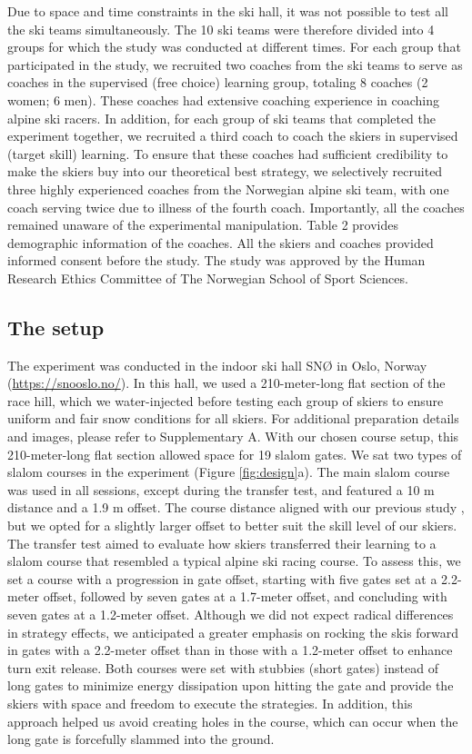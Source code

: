 \documentclass[pdflatex,sn-mathphys-num]{sn-jnl}%
\theoremstyle{thmstyleone}%
\theoremstyle{thmstyletwo}%
\theoremstyle{thmstylethree}%
\begin{document}
Due to space and time constraints in the ski hall, it was not possible to test all the ski teams simultaneously. The 10 ski teams were therefore divided into 4 groups for which the study was conducted at different times. For each group that participated in the study, we recruited two coaches from the ski teams to serve as coaches in the supervised (free choice) learning group, totaling 8 coaches (2 women; 6 men). These coaches had extensive coaching experience in coaching alpine ski racers. In addition, for each group of ski teams that completed the experiment together, we recruited a third coach to coach the skiers in supervised (target skill) learning. To ensure that these coaches had sufficient credibility to make the skiers buy into our theoretical best strategy, we selectively recruited three highly experienced coaches from the Norwegian alpine ski team, with one coach serving twice due to illness of the fourth coach. Importantly, all the coaches remained unaware of the experimental manipulation. Table 2 provides demographic information of the coaches. All the skiers and coaches provided informed consent before the study. The study was approved by the Human Research Ethics Committee of The Norwegian School of Sport Sciences.


\subsection{The setup}
The experiment was conducted in the indoor ski hall SNØ in Oslo, Norway (\url{https://snooslo.no/}). In this hall, we used a 210-meter-long flat section of the race hill, which we water-injected before testing each group of skiers to ensure uniform and fair snow conditions for all skiers. For additional preparation details and images, please refer to Supplementary A. With our chosen course setup, this 210-meter-long flat section allowed space for 19 slalom gates. We sat two types of slalom courses in the experiment (Figure \ref{fig:design}a). The main slalom course was used in all sessions, except during the transfer test, and featured a 10 m distance and a 1.9 m offset. The course distance aligned with our previous study \cite{magelssen_is_2022}, but we opted for a slightly larger offset to better suit the skill level of our skiers. The transfer test aimed to evaluate how skiers transferred their learning to a slalom course that resembled a typical alpine ski racing course. To assess this, we set a course with a progression in gate offset, starting with five gates set at a 2.2-meter offset, followed by seven gates at a 1.7-meter offset, and concluding with seven gates at a 1.2-meter offset. Although we did not expect radical differences in strategy effects, we anticipated a greater emphasis on rocking the skis forward in gates with a 2.2-meter offset than in those with a 1.2-meter offset to enhance turn exit release. Both courses were set with stubbies (short gates) instead of long gates to minimize energy dissipation upon hitting the gate \cite{minetti_biomechanics_2018} and provide the skiers with space and freedom to execute the strategies. In addition, this approach helped us avoid creating holes in the course, which can occur when the long gate is forcefully slammed into the ground.
\end{document}
